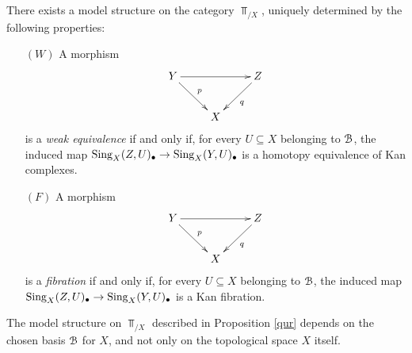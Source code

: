 \begin{proposition}\label{qur}
There exists a model structure on the category $\Top_{/X}$, uniquely determined by the following properties:
\begin{itemize}
\item[$(W)$] A morphism $$ \xymatrix{ Y \ar[rr] \ar[dr]^{p} & & Z \ar[dl]^{q} \\
& X & }$$ is a {\it weak equivalence} if and only if, for every $U \subseteq X$ belonging to $\operatorname{\mathcal{B}}$, the induced map $\operatorname{Sing}_X(Z,U)_{\bullet} \rightarrow \operatorname{Sing}_X(Y,U)_{\bullet}$ is a homotopy equivalence of Kan complexes.
\item[$(F)$] A morphism $$ \xymatrix{ Y \ar[rr] \ar[dr]^{p} & & Z \ar[dl]^{q} \\
& X & }$$ is a {\it fibration} if and only if, for every $U \subseteq X$ belonging to $\operatorname{\mathcal{B}}$, the induced map $\operatorname{Sing}_X(Z,U)_{\bullet} \rightarrow \operatorname{Sing}_X(Y,U)_{\bullet}$ is a Kan fibration.
\end{itemize}
\end{proposition}

\begin{remark}
The model structure on $\Top_{/X}$ described in Proposition \ref{qur} depends on the chosen basis $\operatorname{\mathcal{B}}$ for $X$, and not only on the topological space $X$ itself.
\end{remark}

